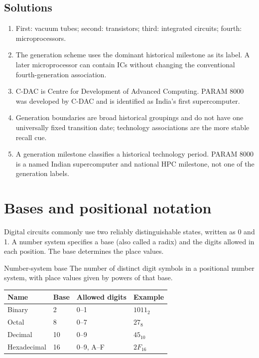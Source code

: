 \subsection*{Solutions}
\begingroup\small
\begin{enumerate}[label=\arabic*.]
  \item First: vacuum tubes; second: transistors; third: integrated
    circuits; fourth: microprocessors.
  \item The generation scheme uses the dominant historical milestone as its
    label. A later microprocessor can contain ICs without changing the
    conventional fourth-generation association.
  \item C-DAC is Centre for Development of Advanced Computing. PARAM 8000
    was developed by C-DAC and is identified as India's first
    supercomputer.
  \item Generation boundaries are broad historical groupings and do not
    have one universally fixed transition date; technology associations
    are the more stable recall cue.
  \item A generation milestone classifies a historical technology period.
    PARAM 8000 is a named Indian supercomputer and national HPC milestone,
    not one of the generation labels.
\end{enumerate}
\endgroup

\section{Bases and positional notation}
Digital circuits commonly use two reliably distinguishable states, written
as 0 and 1. A number system specifies a base (also called a radix) and the
digits allowed in each position. The base determines the place values.

\begin{definitionbox}{Number-system base}
The number of distinct digit symbols in a positional number system, with
place values given by powers of that base.
\end{definitionbox}

\begin{center}
\begin{tabular}{llll}
\textbf{Name} & \textbf{Base} & \textbf{Allowed digits} &
\textbf{Example}\\
\hline
Binary & 2 & 0--1 & $1011_2$\\
Octal & 8 & 0--7 & $27_8$\\
Decimal & 10 & 0--9 & $45_{10}$\\
Hexadecimal & 16 & 0--9, A--F & $2F_{16}$\\
\end{tabular}
\end{center}

